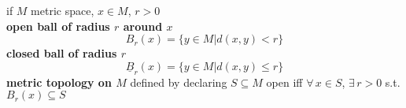 if $M$ metric space, $x\in M$, $r>0$ \\
\phantom{\quad } \textbf{open ball of radius $r$ around $x$ } 
\[
B_r(x) = \{ y \in M | d(x,y) < r \}
\]
\phantom{\quad \quad } \textbf{closed ball of radius $r$ }
\[
\underline{B}_r(x) = \{ y \in M | d(x,y) \leq r \}
\]
\textbf{metric topology on $M$ } defined by declaring $S \subseteq M$ open iff $\forall \, x \in S$, $\exists \, r >0$ s.t. $B_r(x) \subseteq S$

